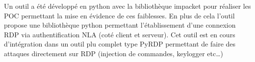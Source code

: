 Un outil a été développé en python avec la bibliothèque impacket pour réaliser les POC permettant la mise en évidence de ces faiblesses.
En plus de cela l’outil propose une bibliothèque python permettant l’établissement d’une connexion RDP via authentification NLA (coté client et serveur). Cet outil est en cours d’intégration dans un outil plu complet type PyRDP permettant de faire des attaques directement sur RDP (injection de commandes, keylogger etc…)
